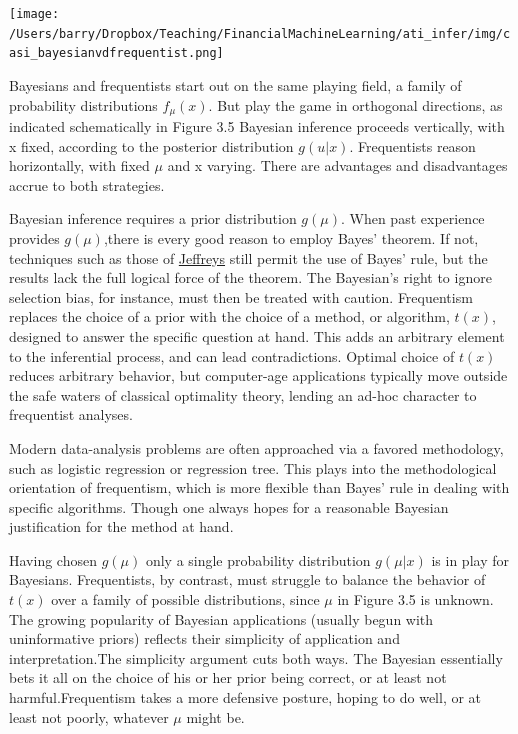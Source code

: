 \documentclass{article}
\begin{document}
\texttt{[image: /Users/barry/Dropbox/Teaching/FinancialMachineLearning/ati\_infer/img/casi\_bayesianvdfrequentist.png]}

Bayesians and frequentists start out on the same playing field, a family
of probability distributions \(f_{\mu}(x)\). But play the game in
orthogonal directions, as indicated schematically in Figure 3.5 Bayesian
inference proceeds vertically, with x fixed, according to the posterior
distribution \(g(u|x)\). Frequentists reason horizontally, with fixed
\(\mu\) and x varying. There are advantages and disadvantages accrue to
both strategies.

Bayesian inference requires a prior distribution \(g(\mu)\). When past
experience provides \(g(\mu)\),there is every good reason to employ
Bayes' theorem. If not, techniques such as those of
\href{https://en.wikipedia.org/wiki/Jeffreys_prior}{Jeffreys} still
permit the use of Bayes' rule, but the results lack the full logical
force of the theorem. The Bayesian's right to ignore selection bias, for
instance, must then be treated with caution. Frequentism replaces the
choice of a prior with the choice of a method, or algorithm, \(t(x)\),
designed to answer the specific question at hand. This adds an arbitrary
element to the inferential process, and can lead contradictions. Optimal
choice of \(t(x)\) reduces arbitrary behavior, but computer-age
applications typically move outside the safe waters of classical
optimality theory, lending an ad-hoc character to frequentist analyses.

Modern data-analysis problems are often approached via a favored
methodology, such as logistic regression or regression tree. This plays
into the methodological orientation of frequentism, which is more
flexible than Bayes' rule in dealing with specific algorithms. Though
one always hopes for a reasonable Bayesian justification for the method
at hand.

Having chosen \(g(\mu)\) only a single probability distribution
\(g(\mu|x)\) is in play for Bayesians. Frequentists, by contrast, must
struggle to balance the behavior of \(t(x)\) over a family of possible
distributions, since \(\mu\) in Figure 3.5 is unknown. The growing
popularity of Bayesian applications (usually begun with uninformative
priors) reflects their simplicity of application and interpretation.The
simplicity argument cuts both ways. The Bayesian essentially bets it all
on the choice of his or her prior being correct, or at least not
harmful.Frequentism takes a more defensive posture, hoping to do well,
or at least not poorly, whatever \(\mu\) might be.
\end{document}
